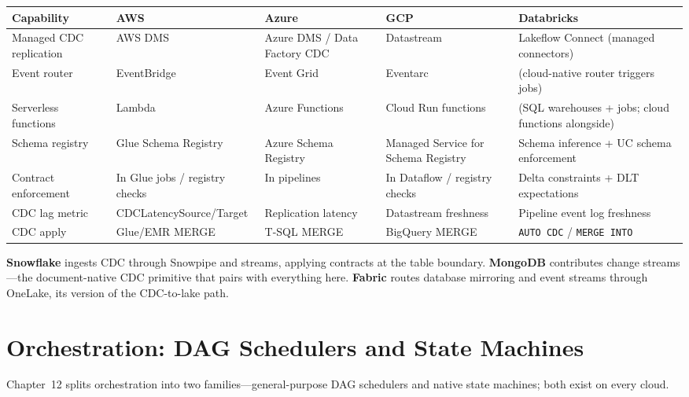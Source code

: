 \begin{center}
\footnotesize
\begin{tabular}{@{}p{2.4cm}p{2.9cm}p{2.9cm}p{2.9cm}p{2.9cm}@{}}
\toprule
\textbf{Capability} & \textbf{AWS} & \textbf{Azure} & \textbf{GCP} & \textbf{Databricks} \\
\midrule
Managed CDC replication & AWS DMS & Azure DMS / Data Factory CDC & Datastream & Lakeflow Connect (managed connectors) \\
Event router & EventBridge & Event Grid & Eventarc & (cloud-native router triggers jobs) \\
Serverless functions & Lambda & Azure Functions & Cloud Run functions & (SQL warehouses + jobs; cloud functions alongside) \\
Schema registry & Glue Schema Registry & Azure Schema Registry & Managed Service for Schema Registry & Schema inference + UC schema enforcement \\
Contract enforcement & In Glue jobs / registry checks & In pipelines & In Dataflow / registry checks & Delta constraints + DLT expectations \\
\addlinespace
CDC lag metric & CDCLatencySource/Target & Replication latency & Datastream freshness & Pipeline event log freshness \\
CDC apply & Glue/EMR MERGE & T-SQL MERGE & BigQuery MERGE & \texttt{AUTO CDC} / \texttt{MERGE INTO} \\
\bottomrule
\end{tabular}
\end{center}

\noindent \textbf{Snowflake} ingests CDC through Snowpipe and streams, applying contracts at the
table boundary. \textbf{MongoDB} contributes change streams---the document-native CDC primitive
that pairs with everything here. \textbf{Fabric} routes database mirroring and event streams
through OneLake, its version of the CDC-to-lake path.

\section{Orchestration: DAG Schedulers and State Machines}
%
Chapter~12 splits orchestration into two families---general-purpose DAG schedulers and native
state machines; both exist on every cloud.

